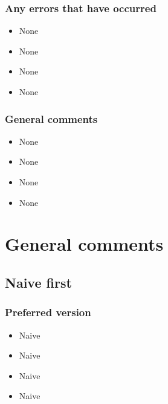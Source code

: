 \subsubsection{Any errors that have occurred}
\begin{itemize}
\item None

\item None

\item None

\item None

\end{itemize}


\subsubsection{General comments}
\begin{itemize}
\item None

\item None

\item None

\item None

\end{itemize}


\section{General comments}
\subsection{Naive first}
\subsubsection{Preferred version}
\begin{itemize}
\item Naive

\item Naive

\item Naive

\item Naive

\end{itemize}



